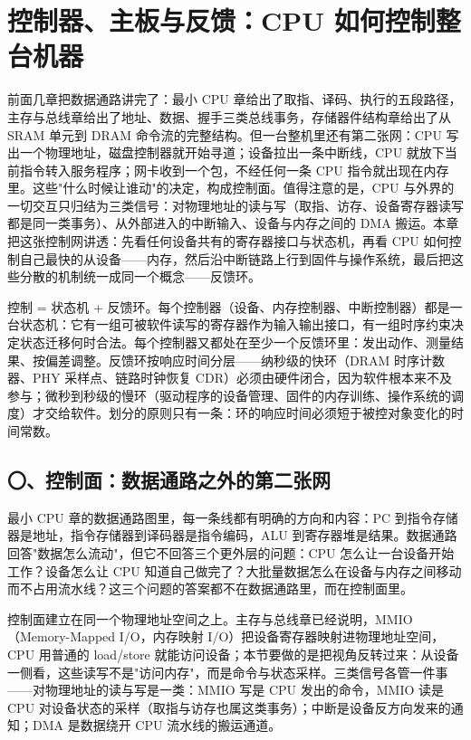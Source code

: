\chapter{控制器、主板与反馈：CPU 如何控制整台机器}

前面几章把数据通路讲完了：最小 CPU 章给出了取指、译码、执行的五段路径，主存与总线章给出了地址、数据、握手三类总线事务，存储器件结构章给出了从 SRAM 单元到 DRAM 命令流的完整结构。但一台整机里还有第二张网：CPU 写出一个物理地址，磁盘控制器就开始寻道；设备拉出一条中断线，CPU 就放下当前指令转入服务程序；网卡收到一个包，不经任何一条 CPU 指令就出现在内存里。这些"什么时候让谁动"的决定，构成控制面。值得注意的是，CPU 与外界的一切交互只归结为三类信号：对物理地址的读与写（取指、访存、设备寄存器读写都是同一类事务）、从外部进入的中断输入、设备与内存之间的 DMA 搬运。本章把这张控制网讲透：先看任何设备共有的寄存器接口与状态机，再看 CPU 如何控制自己最快的从设备——内存，然后沿中断链路上行到固件与操作系统，最后把这些分散的机制统一成同一个概念——反馈环。

\begin{keyidea}
控制 = 状态机 + 反馈环。每个控制器（设备、内存控制器、中断控制器）都是一台状态机：它有一组可被软件读写的寄存器作为输入输出接口，有一组时序约束决定状态迁移何时合法。每个控制器又都处在至少一个反馈环里：发出动作、测量结果、按偏差调整。反馈环按响应时间分层——纳秒级的快环（DRAM 时序计数器、PHY 采样点、链路时钟恢复 CDR）必须由硬件闭合，因为软件根本来不及参与；微秒到秒级的慢环（驱动程序的设备管理、固件的内存训练、操作系统的调度）才交给软件。划分的原则只有一条：环的响应时间必须短于被控对象变化的时间常数。
\end{keyidea}

\section{〇、控制面：数据通路之外的第二张网}

最小 CPU 章的数据通路图里，每一条线都有明确的方向和内容：PC 到指令存储器是地址，指令存储器到译码器是指令编码，ALU 到寄存器堆是结果。数据通路回答"数据怎么流动"，但它不回答三个更外层的问题：CPU 怎么让一台设备开始工作？设备怎么让 CPU 知道自己做完了？大批量数据怎么在设备与内存之间移动而不占用流水线？这三个问题的答案都不在数据通路里，而在控制面里。

控制面建立在同一个物理地址空间之上。主存与总线章已经说明，MMIO（Memory-Mapped I/O，内存映射 I/O）把设备寄存器映射进物理地址空间，CPU 用普通的 load/store 就能访问设备；本节要做的是把视角反转过来：从设备一侧看，这些读写不是"访问内存"，而是命令与状态采样。三类信号各管一件事——对物理地址的读与写是一类：MMIO 写是 CPU 发出的命令，MMIO 读是 CPU 对设备状态的采样（取指与访存也属这类事务）；中断是设备反方向发来的通知；DMA 是数据绕开 CPU 流水线的搬运通道。

